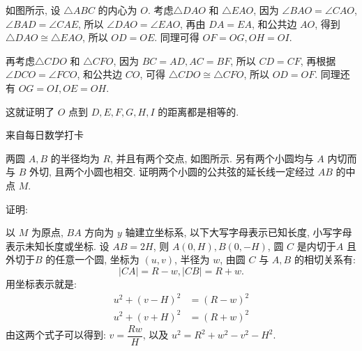 如图所示, 设 $\triangle ABC$ 的内心为 $O$. 考虑$\triangle DAO$ 和 $\triangle EAO$, 因为 $\angle BAO = \angle CAO$, $\angle BAD = \angle CAE$, 所以 $\angle DAO = \angle EAO$, 再由 $DA = EA$, 和公共边 $AO$, 得到 $\triangle DAO \cong \triangle EAO$, 所以 $OD = OE$. 同理可得 $OF = OG, OH = OI$.

再考虑$\triangle CDO$ 和 $\triangle CFO$, 因为 $BC = AD, AC = BF$, 所以 $CD = CF$, 再根据 $\angle DCO = \angle FCO$, 和公共边 $CO$, 可得 $\triangle CDO \cong \triangle CFO$, 所以 $OD = OF$. 同理还有 $ OG = OI, OE = OH$.

这就证明了 $O$ 点到 $D,E,F,G,H,I$ 的距离都是相等的.

\newpage
\noindent 来自每日数学打卡

两圆 $A,B$ 的半径均为 $R$, 并且有两个交点, 如图所示. 另有两个小圆均与 $A$ 内切而与 $B$ 外切, 且两个小圆也相交. 证明两个小圆的公共弦的延长线一定经过 $AB$ 的中点 $M$.

\begin{figure*}[htbp]
\centering
{}
\end{figure*}

\noindent 证明: 

以 $M$ 为原点, $BA$ 方向为 $y$ 轴建立坐标系, 以下大写字母表示已知长度, 小写字母表示未知长度或坐标. 设 $AB = 2H$, 则 $A(0,H), B(0,-H)$, 圆 $C$ 是内切于$A$ 且外切于$B$ 的任意一个圆, 坐标为 $(u,v)$, 半径为 $w$, 由圆 $C$ 与 $A,B$ 的相切关系有: 
\[ |CA| = R-w, |CB| = R+w. \]
用坐标表示就是:
\begin{align*}
u^2 + (v-H)^2 &= (R-w)^2 \\
u^2 + (v+H)^2 &= (R+w)^2
\end{align*}
由这两个式子可以得到: $v = \dfrac{Rw}{H}$, 以及 $u^2 = R^2+w^2-v^2-H^2$.

